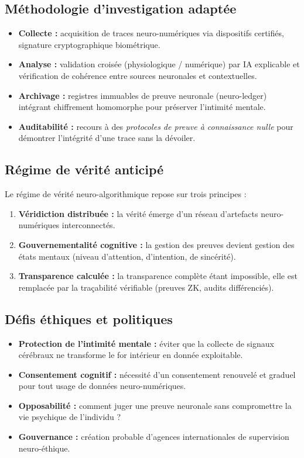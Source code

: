 \documentclass[memoire, 12pt]{report}
\begin{document}
\subsection*{Méthodologie d’investigation adaptée}
\begin{itemize}
  \item \textbf{Collecte :} acquisition de traces neuro-numériques via dispositifs certifiés, signature cryptographique biométrique.
  \item \textbf{Analyse :} validation croisée (physiologique / numérique) par IA explicable et vérification de cohérence entre sources neuronales et contextuelles.
  \item \textbf{Archivage :} registres immuables de preuve neuronale (neuro-ledger) intégrant chiffrement homomorphe pour préserver l’intimité mentale.
  \item \textbf{Auditabilité :} recours à des \textit{protocoles de preuve à connaissance nulle} pour démontrer l’intégrité d’une trace sans la dévoiler.
\end{itemize}

\subsection*{Régime de vérité anticipé}
Le régime de vérité neuro-algorithmique repose sur trois principes :
\begin{enumerate}[label=\textbf{\arabic*.}]
  \item \textbf{Véridiction distribuée :} la vérité émerge d’un réseau d’artefacts neuro-numériques interconnectés.
  \item \textbf{Gouvernementalité cognitive :} la gestion des preuves devient gestion des états mentaux (niveau d’attention, d’intention, de sincérité).
  \item \textbf{Transparence calculée :} la transparence complète étant impossible, elle est remplacée par la traçabilité vérifiable (preuves ZK, audits différenciés).
\end{enumerate}

\subsection*{Défis éthiques et politiques}
\begin{itemize}
  \item \textbf{Protection de l’intimité mentale :} éviter que la collecte de signaux cérébraux ne transforme le for intérieur en donnée exploitable.
  \item \textbf{Consentement cognitif :} nécessité d’un consentement renouvelé et graduel pour tout usage de données neuro-numériques.
  \item \textbf{Opposabilité :} comment juger une preuve neuronale sans compromettre la vie psychique de l’individu ?
  \item \textbf{Gouvernance :} création probable d’agences internationales de supervision neuro-éthique.
\end{itemize}
\end{document}

